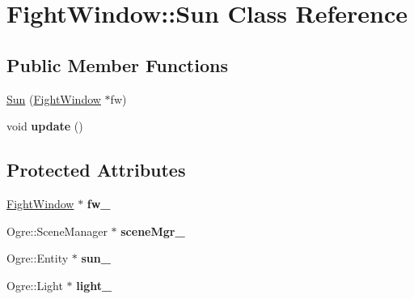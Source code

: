 \hypertarget{class_fight_window_1_1_sun}{}\section{Fight\+Window\+:\+:Sun Class Reference}
\label{class_fight_window_1_1_sun}
\subsection*{Public Member Functions}
\begin{DoxyCompactItemize}
\item 
\hyperlink{class_fight_window_1_1_sun_ab1b37689641a2c4984b9edd74d8417a5}{Sun} (\hyperlink{class_fight_window}{Fight\+Window} $\ast$fw)
\item 
void {\bfseries update} ()\hypertarget{class_fight_window_1_1_sun_a48eab03e7a64c7a174e3ad56adb374fe}{}\label{class_fight_window_1_1_sun_a48eab03e7a64c7a174e3ad56adb374fe}

\end{DoxyCompactItemize}
\subsection*{Protected Attributes}
\begin{DoxyCompactItemize}
\item 
\hyperlink{class_fight_window}{Fight\+Window} $\ast$ {\bfseries fw\+\_\+}\hypertarget{class_fight_window_1_1_sun_a94ea48d6d5ac1d80bfb65e610f870603}{}\label{class_fight_window_1_1_sun_a94ea48d6d5ac1d80bfb65e610f870603}

\item 
Ogre\+::\+Scene\+Manager $\ast$ {\bfseries scene\+Mgr\+\_\+}\hypertarget{class_fight_window_1_1_sun_acc6f61ecaa27356b856f4fe2fe42fbb1}{}\label{class_fight_window_1_1_sun_acc6f61ecaa27356b856f4fe2fe42fbb1}

\item 
Ogre\+::\+Entity $\ast$ {\bfseries sun\+\_\+}\hypertarget{class_fight_window_1_1_sun_a91d003e03fa68d41817eddecba0f130e}{}\label{class_fight_window_1_1_sun_a91d003e03fa68d41817eddecba0f130e}

\item 
Ogre\+::\+Light $\ast$ {\bfseries light\+\_\+}\hypertarget{class_fight_window_1_1_sun_a3046dbe4a2e661ceeb5da179bf7b39ba}{}\label{class_fight_window_1_1_sun_a3046dbe4a2e661ceeb5da179bf7b39ba}

\end{DoxyCompactItemize}


